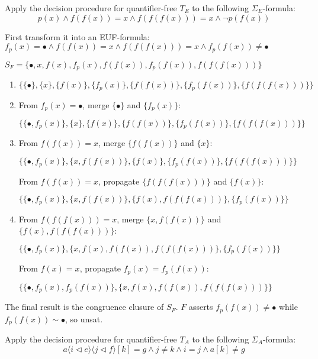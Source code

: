 \documentclass[11pt,a4paper]{article}
\newcommand{\upd}[2]{\langle #1 \triangleleft #2 \rangle}
\begin{document}
\subproblem Apply the decision procedure for quantifier-free $T_E$ to the following $\Sigma_E$-formula:
$$p(x) \land f(f(x)) = x \land f(f(f(x))) = x \land \lnot p(f(x))$$

\begin{solution}
  First transform it into an EUF-formula: $f_p(x) = \bullet \land f(f(x)) = x \land f(f(f(x))) = x \land f_p(f(x)) \ne \bullet$
  
  $S_F = \{\bullet, x, f(x), f_p(x), f(f(x)), f_p(f(x)), f(f(f(x)))\}$
  
  \begin{enumerate}[label = Step \arabic*:, start = 0]
    \item $\{\{\bullet\}, \{x\}, \{f(x)\}, \{f_p(x)\}, \{f(f(x))\}, \{f_p(f(x))\}, \{f(f(f(x)))\}\}$
    
    \item From $f_p(x) = \bullet$, merge $\{\bullet\}$ and $\{f_p(x)\}$:
    
    $\{\{\bullet, f_p(x)\}, \{x\}, \{f(x)\}, \{f(f(x))\}, \{f_p(f(x))\}, \{f(f(f(x)))\}\}$
    
    \item From $f(f(x)) = x$, merge $\{f(f(x))\}$ and $\{x\}$:
    
    $\{\{\bullet, f_p(x)\}, \{x, f(f(x))\}, \{f(x)\}, \{f_p(f(x))\}, \{f(f(f(x)))\}\}$
    
    From $f(f(x)) = x$, propagate $\{f(f(f(x)))\}$ and $\{f(x)\}$:
    
    $\{\{\bullet, f_p(x)\}, \{x, f(f(x))\}, \{f(x), f(f(f(x)))\}, \{f_p(f(x))\}\}$
    
    \item From $f(f(f(x))) = x$, merge $\{x, f(f(x))\}$ and $\{f(x), f(f(f(x)))\}$:
    
    $\{\{\bullet, f_p(x)\}, \{x, f(x), f(f(x)), f(f(f(x)))\}, \{f_p(f(x))\}\}$
    
    From $f(x) = x$, propagate $f_p(x) = f_p(f(x))$:
    
    $\{\{\bullet, f_p(x), f_p(f(x))\}, \{x, f(x), f(f(x)), f(f(f(x)))\}\}$
  \end{enumerate}

  The final result is the congruence clusure of $S_F$. $F$ asserts $f_p(f(x)) \ne \bullet$ while $f_p(f(x)) \sim \bullet$, so unsat.
\end{solution}

\subproblem Apply the decision procedure for quantifier-free $T_A$ to the following $\Sigma_A$-formula:
$$a\upd{i}{e}\upd{j}{f}[k]=g \land j\not=k \land i=j \land a[k]\not=g$$
\end{document}
